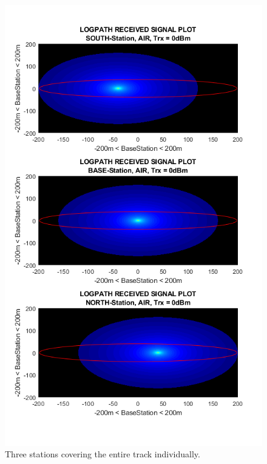 \begin{figure}[h]
	\centering
	\includegraphics[width=1\linewidth]{theory/pathLoss/fig/logpathReceivedSignal_eachStation_air_highSignal.png}
	\caption{Three stations covering the entire track individually.}
	\label{fig:logpathReceivedSignal_eachStation_air_highSignal}
\end{figure}

